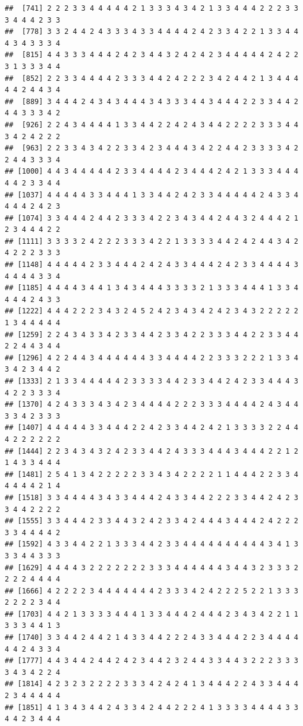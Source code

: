 \documentclass[]{book}
\begin{document}
\begin{verbatim}
##  [741] 2 2 2 3 3 4 4 4 4 4 2 1 3 3 3 4 3 4 2 1 3 3 4 4 4 2 2 2 3 3 3 4 4 4 2 3 3
##  [778] 3 3 2 4 4 2 4 3 3 3 4 3 3 4 4 4 4 2 4 2 3 3 4 2 2 1 3 3 4 4 4 3 4 3 3 3 4
##  [815] 4 4 3 3 3 4 4 4 2 4 2 3 4 4 3 2 4 2 4 2 3 4 4 4 4 4 2 4 2 2 3 1 3 3 3 4 4
##  [852] 2 2 3 3 4 4 4 4 2 3 3 3 4 4 2 4 2 2 2 3 4 2 4 4 2 1 3 4 4 4 4 4 2 4 4 3 4
##  [889] 3 4 4 4 2 4 3 4 3 4 4 4 3 4 3 3 3 4 4 3 4 4 4 2 2 3 3 4 4 2 4 4 3 3 3 4 2
##  [926] 2 2 4 3 4 4 4 4 1 3 3 4 4 2 2 4 2 4 3 4 4 2 2 2 2 3 3 3 4 4 3 4 2 4 2 2 2
##  [963] 2 2 3 3 4 3 4 2 2 3 3 4 2 3 4 4 4 3 4 2 2 4 4 2 3 3 3 3 4 2 2 4 4 3 3 3 4
## [1000] 4 4 3 4 4 4 4 4 2 3 3 4 4 4 4 2 3 4 4 4 2 4 2 1 3 3 3 4 4 4 4 4 2 3 3 4 4
## [1037] 4 4 4 4 4 3 3 4 4 4 1 3 3 4 4 2 4 2 3 3 4 4 4 4 4 2 4 3 3 4 4 4 4 2 4 2 3
## [1074] 3 3 4 4 4 2 4 4 2 3 3 3 4 2 2 3 4 3 4 4 2 4 4 3 2 4 4 4 2 1 2 3 4 4 4 2 2
## [1111] 3 3 3 3 2 4 2 2 2 3 3 3 4 2 2 1 3 3 3 3 4 4 2 4 2 4 4 3 4 2 4 2 2 2 3 3 3
## [1148] 4 4 4 4 4 2 3 3 4 4 4 2 4 2 4 3 3 4 4 4 2 4 2 3 3 4 4 4 4 3 4 4 4 4 3 3 4
## [1185] 4 4 4 4 3 4 4 1 3 4 3 4 4 4 3 3 3 3 2 1 3 3 3 4 4 4 1 3 3 4 4 4 4 2 4 3 3
## [1222] 4 4 4 2 2 2 3 4 3 2 4 5 2 4 2 3 4 3 4 2 4 2 3 4 3 2 2 2 2 2 1 3 4 4 4 4 4
## [1259] 2 2 4 3 4 3 3 4 2 3 3 4 4 2 3 3 4 2 2 3 3 3 4 4 2 2 3 3 4 4 2 2 4 4 3 4 4
## [1296] 4 2 2 4 4 3 4 4 4 4 4 4 3 3 4 4 4 4 2 2 3 3 3 2 2 2 1 3 3 4 3 4 2 3 4 4 2
## [1333] 2 1 3 3 4 4 4 4 4 2 3 3 3 3 4 4 2 3 3 4 4 2 4 2 3 3 4 4 4 3 4 2 2 3 3 3 4
## [1370] 4 2 4 3 3 3 4 3 4 2 3 4 4 4 4 2 2 2 3 3 3 4 4 4 4 2 4 3 4 4 3 3 4 2 3 3 3
## [1407] 4 4 4 4 4 3 3 4 4 4 2 2 4 2 3 3 4 4 2 4 2 1 3 3 3 3 2 2 4 4 4 2 2 2 2 2 2
## [1444] 2 2 3 4 3 4 3 2 4 2 3 3 4 4 2 4 3 3 3 4 4 4 3 4 4 4 2 2 1 2 1 4 3 3 4 4 4
## [1481] 2 5 4 1 3 4 2 2 2 2 2 3 3 4 3 4 2 2 2 2 1 1 4 4 4 2 2 3 3 4 4 4 4 4 2 1 4
## [1518] 3 3 4 4 4 4 3 4 3 3 4 4 4 2 4 3 3 4 4 2 2 2 3 3 4 4 2 4 2 3 3 4 4 2 2 2 2
## [1555] 3 3 4 4 4 2 3 3 4 4 3 2 4 2 3 3 4 2 4 4 4 3 4 4 4 2 4 2 2 2 3 3 4 4 4 4 2
## [1592] 4 3 3 4 4 2 2 1 3 3 3 4 4 2 3 3 4 4 4 4 4 4 4 4 4 4 3 4 1 3 3 3 4 4 3 3 3
## [1629] 4 4 4 4 3 2 2 2 2 2 2 2 3 3 3 4 4 4 4 4 4 3 4 4 3 2 3 3 3 2 2 2 2 4 4 4 4
## [1666] 4 2 2 2 2 3 4 4 4 4 4 4 4 2 3 3 3 4 2 4 2 2 2 5 2 2 1 3 3 3 2 2 2 2 3 4 4
## [1703] 4 4 2 1 3 3 3 3 4 4 4 1 3 3 4 4 4 2 4 4 4 2 3 4 3 4 2 2 1 1 3 3 3 4 4 1 3
## [1740] 3 3 4 4 2 4 4 2 1 4 3 3 4 4 2 2 2 4 3 3 4 4 4 2 2 3 4 4 4 4 4 4 2 4 3 3 4
## [1777] 4 4 3 4 4 2 4 4 2 4 2 3 4 4 2 3 2 4 4 3 3 4 4 3 2 2 2 3 3 3 3 4 3 4 2 2 4
## [1814] 4 2 3 2 3 2 2 2 2 3 3 3 4 2 4 2 4 1 3 4 4 4 2 2 4 3 3 4 4 4 2 3 4 4 4 4 4
## [1851] 4 1 3 4 3 4 4 2 4 3 3 4 2 4 4 2 2 2 4 1 3 3 3 3 4 4 4 4 3 3 4 4 2 3 4 4 4

\end{verbatim}
\end{document}
